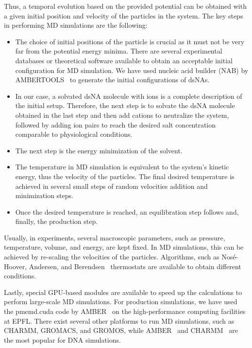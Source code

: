 Thus, a temporal evolution based on the provided potential can be obtained with a given initial position and velocity of the particles in the system. 
The key steps in performing MD simulations are the following: 
\begin{itemize}
\item The choice of initial positions of the particle is crucial as it must not be very far from the potential energy minima. There are several experimental databases or theoretical software available to obtain an acceptable initial configuration for MD simulation. 
We have used nucleic acid builder (NAB) by AMBERTOOLS~\cite{amber} to generate the initial configurations of dsNAs.
\item In our case, a solvated dsNA molecule with ions is a complete description of the initial setup. Therefore, the next step is to solvate the dsNA molecule obtained in the last step and then add cations to neutralize the system, followed by adding ion pairs to reach the desired salt concentration comparable to physiological conditions.
\item The next step is the energy minimization of the solvent.
\item The temperature in MD simulation is equivalent to the system's kinetic energy, thus the velocity of the particles. The final desired temperature is achieved in several small steps of random velocities addition and minimization steps.
\item Once the desired temperature is reached, an equilibration step follows and, finally, the production step. 
\label{c3:list1}
\end{itemize}
Usually, in experiments, several macroscopic parameters, such as pressure, temperature, volume, and energy, are kept fixed.
In MD simulations, this can be achieved by re-scaling the velocities of the particles. 
Algorithms, such as Nosé-Hoover, Andersen, and  Berendsen~\cite{npt} thermostats are available to obtain different conditions.

Lastly, special GPU-based modules are available to speed up the calculations to perform large-scale MD simulations.
For production simulations, we have used the pmemd.cuda code by AMBER~\cite{amber} on the high-performance computing facilities at EPFL.
There exist several other platforms to run MD simulations, such as CHARMM, GROMACS, and GROMOS, while AMBER~\cite{amber,pearlman1995amber,case2005amber} and CHARMM~\cite{brooks2009charmm,brooks1983charmm} are the most popular for DNA simulations.

